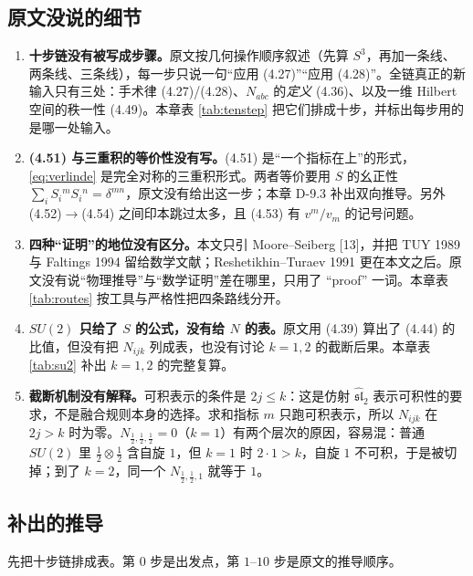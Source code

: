 \subsection{原文没说的细节}

\begin{enumerate}[label=G9.\arabic*,leftmargin=*]
  \item \textbf{十步链没有被写成步骤。}原文按几何操作顺序叙述（先算 $S^3$，再加一条线、两条线、三条线），每一步只说一句“应用 (4.27)”“应用 (4.28)”。全链真正的新输入只有三处：手术律 (4.27)/(4.28)、$N_{abc}$ 的\emph{定义} (4.36)、以及一维 Hilbert 空间的秩一性 (4.49)。本章表 \ref{tab:tenstep} 把它们排成十步，并标出每步用的是哪一处输入。\ours
  \item \textbf{(4.51) 与三重积的等价性没有写。}(4.51) 是“一个指标在上”的形式，\eqref{eq:verlinde} 是完全对称的三重积形式。两者等价要用 $S$ 的幺正性 $\sum_i S_i{}^m S_i{}^n=\delta^{mn}$，原文没有给出这一步；本章 D-9.3 补出双向推导。另外 (4.52)$\to$(4.54) 之间印本跳过太多，且 (4.53) 有 $v^m/v_m$ 的记号问题。\ours
  \item \textbf{四种“证明”的地位没有区分。}本文只引 Moore--Seiberg [13]，并把 TUY 1989 与 Faltings 1994 留给数学文献；Reshetikhin--Turaev 1991 更在本文之后。原文没有说“物理推导”与“数学证明”差在哪里，只用了 “proof” 一词。本章表 \ref{tab:routes} 按工具与严格性把四条路线分开。\ours
  \item \textbf{$SU(2)$ 只给了 $S$ 的公式，没有给 $N$ 的表。}原文用 (4.39) 算出了 (4.44) 的比值，但没有把 $N_{ijk}$ 列成表，也没有讨论 $k=1,2$ 的截断后果。本章表 \ref{tab:su2} 补出 $k=1,2$ 的完整复算。\ours
  \item \textbf{截断机制没有解释。}可积表示的条件是 $2j\le k$：这是仿射 $\widehat{\mathfrak{sl}}_2$ 表示可积性的要求，不是融合规则本身的选择。求和指标 $m$ 只跑可积表示，所以 $N_{ijk}$ 在 $2j>k$ 时为零。$N_{\frac12,\frac12,\frac12}=0$（$k=1$）有两个层次的原因，容易混：普通 $SU(2)$ 里 $\frac12\otimes\frac12$ 含自旋 $1$，但 $k=1$ 时 $2\cdot1>k$，自旋 $1$ 不可积，于是被切掉；到了 $k=2$，同一个 $N_{\frac12,\frac12,1}$ 就等于 $1$。\ours
\end{enumerate}

\subsection{补出的推导}

先把十步链排成表。第 $0$ 步是出发点，第 $1$–$10$ 步是原文的推导顺序。

